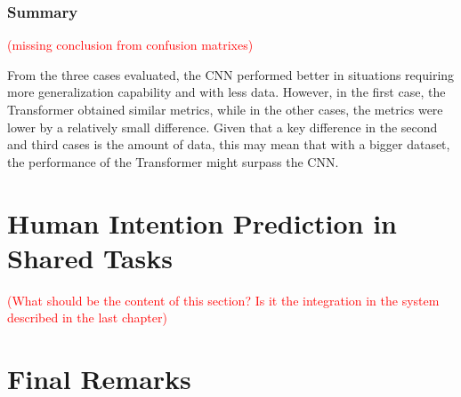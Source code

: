 \subsubsection{Summary}

\textcolor{red}{(missing conclusion from confusion matrixes)}

From the three cases evaluated, the CNN performed better in situations requiring more generalization capability and with less data. However, in the first case, the Transformer obtained similar metrics, while in the other cases, the metrics were lower by a relatively small difference. Given that a key difference in the second and third cases is the amount of data, this may mean that with a bigger dataset, the performance of the Transformer might surpass the CNN.

\section{Human Intention Prediction in Shared Tasks}

\textcolor{red}{(What should be the content of this section? Is it the integration in the system described in the last chapter)}

\section{Final Remarks}